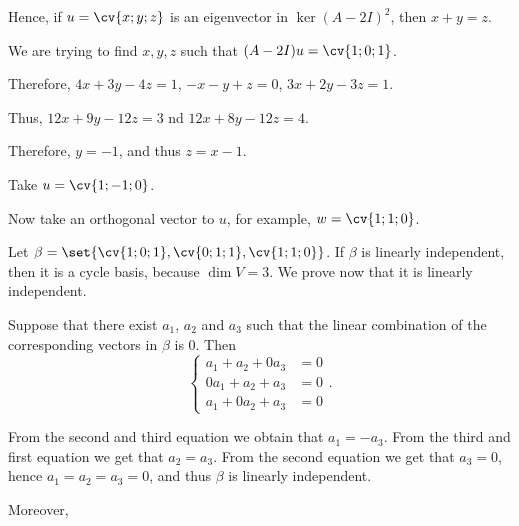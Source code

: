 \documentclass[11pt]{scrartcl}
\begin{document}
\begin{soln}

Hence, if $u = \cv{x;y;z}$ is an eigenvector in $\ker(A-2I)^2$, then
$x+y = z$. 

We are trying to find $x, y, z$ such that $(A-2 I)u = \cv{1;0;1}$.

Therefore, $4x+3y-4z = 1$, $-x-y+z = 0$, $3x+2y-3z = 1$.

Thus, $12x+9y-12z = 3$ nd $12x+8y-12z = 4$. 

Therefore, $y=-1$, and thus $z= x-1$. 

Take $u = \cv{1;-1;0}$.


Now take an orthogonal vector to $u$, for example, $w = \cv{1;1;0}$.

Let $\beta = \set{\cv{1;0;1}, \cv{0;1;1}, \cv{1;1;0}}$. If $\beta$ is linearly independent, then it is a cycle basis, because $\dim V = 3$. We prove now that it is linearly independent. 

Suppose that there exist $a_1$, $a_2$ and $a_3$ such that the linear combination of the corresponding vectors in $\beta$ is 0. Then
\begin{equation*}
  \begin{cases}
a_1+a_2+0a_3 &= 0\\
0a_1+a_2+a_3 &= 0\\
a_1+0a_2+a_3&=0
  \end{cases}.
\end{equation*}

From the second and third equation we obtain that $a_1 = -a_3$. From
the third and first equation we get that $a_2=a_3$. From the second
equation we get that $a_3=0$, hence $a_1=a_2=a_3=0$, and thus $\beta$
is linearly independent.

Moreover, 


\end{soln}
\end{document}
